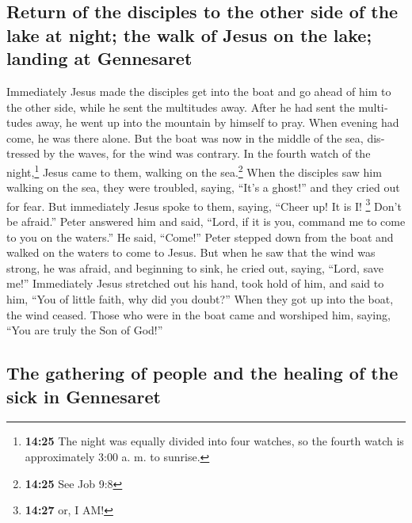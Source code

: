 \begin{paracol}{2}
\begin{otherlanguage}{english}
\hypertarget{return-of-the-disciples-to-the-other-side-of-the-lake-at-night-the-walk-of-jesus-on-the-lake-landing-at-gennesaret}{%
\subsection{Return of the disciples to the other side of the lake at
night; the walk of Jesus on the lake; landing at
Gennesaret}\label{return-of-the-disciples-to-the-other-side-of-the-lake-at-night-the-walk-of-jesus-on-the-lake-landing-at-gennesaret}}

 Immediately Jesus made the disciples get into the boat
and go ahead of him to the other side, while he sent the multitudes
away.  After he had sent the multitudes away, he went up
into the mountain by himself to pray. When evening had come, he was
there alone.  But the boat was now in the middle of the
sea, distressed by the waves, for the wind was contrary. 
In the fourth watch of the night,\footnote{\textbf{14:25} The night was
  equally divided into four watches, so the fourth watch is
  approximately 3:00 a. m. to sunrise.} Jesus came to them, walking on
the sea.\footnote{\textbf{14:25} See Job 9:8}  When the
disciples saw him walking on the sea, they were troubled, saying, ``It's
a ghost!'' and they cried out for fear.  But immediately
Jesus spoke to them, saying, ``Cheer up! It is I! \footnote{\textbf{14:27}
  or, I AM!} Don't be afraid.''  Peter answered him and
said, ``Lord, if it is you, command me to come to you on the waters.''
 He said, ``Come!'' Peter stepped down from the boat and
walked on the waters to come to Jesus.  But when he saw
that the wind was strong, he was afraid, and beginning to sink, he cried
out, saying, ``Lord, save me!''  Immediately Jesus
stretched out his hand, took hold of him, and said to him, ``You of
little faith, why did you doubt?''  When they got up into
the boat, the wind ceased.  Those who were in the boat
came and worshiped him, saying, ``You are truly the Son of God!''

\hypertarget{the-gathering-of-people-and-the-healing-of-the-sick-in-gennesaret}{%
\subsection{The gathering of people and the healing of the sick in
Gennesaret}\label{the-gathering-of-people-and-the-healing-of-the-sick-in-gennesaret}}


\end{otherlanguage}
\end{paracol}
